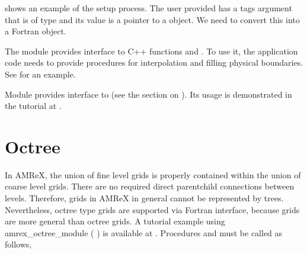 \documentclass[letterpaper,10pt,english]{sphinxmanual}
\begin{document}
\sphinxAtStartPar
{} shows an
example of the setup process. The user provided
 has a tags argument that
is of type  and its value is a pointer to a
 object. We need to convert this into a Fortran
 object.

\begin{sphinxVerbatim}[commandchars=\\\{\}]
  
  
\end{sphinxVerbatim}

\sphinxAtStartPar
The module  provides interface to
C++ functions  and . To use
it, the application code needs to provide procedures for interpolation and
filling physical boundaries.  See
 for an example.

\sphinxAtStartPar
Module  provides interface to
 (see the section on {\hyperref[\detokenize{AmrCore:sec-amrcore-fluxreg}]{}}). Its usage
is demonstrated in the tutorial at .


\section{Octree}
\label{\detokenize{Fortran:octree}}\label{\detokenize{Fortran:sec-fi-octree}}
\sphinxAtStartPar
In AMReX, the union of fine level grids is properly contained within the union
of coarse level grids. There are no required direct parent\sphinxhyphen{}child connections
between levels. Therefore, grids in AMReX in general cannot be represented by
trees. Nevertheless, octree type grids are supported via Fortran interface,
because grids are more general than octree grids. A tutorial example using
amrex\_octree\_module ( ) is
available at . Procedures
 and  must be
called as follows,
\end{document}
